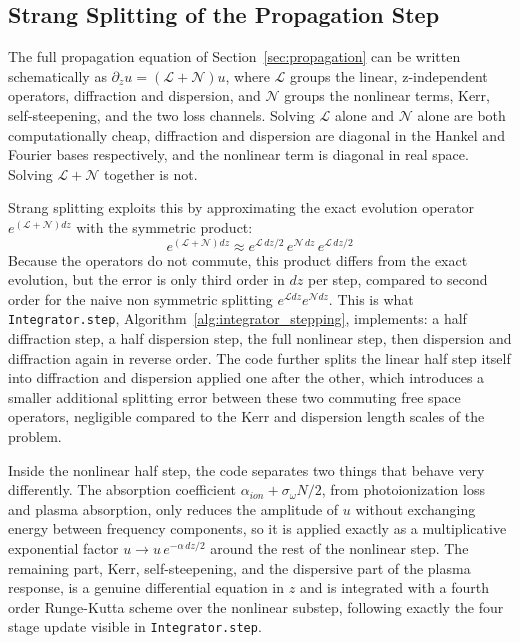 
\subsection{Strang Splitting of the Propagation Step}

The full propagation equation of Section~\ref{sec:propagation} can be written schematically as $\partial_z u = (\mathcal{L}+\mathcal{N})u$, where $\mathcal{L}$ groups the linear, z-independent operators, diffraction and dispersion, and $\mathcal{N}$ groups the nonlinear terms, Kerr, self-steepening, and the two loss channels. Solving $\mathcal{L}$ alone and $\mathcal{N}$ alone are both computationally cheap, diffraction and dispersion are diagonal in the Hankel and Fourier bases respectively, and the nonlinear term is diagonal in real space. Solving $\mathcal{L}+\mathcal{N}$ together is not.

Strang splitting exploits this by approximating the exact evolution operator $e^{(\mathcal{L}+\mathcal{N})dz}$ with the symmetric product:
\begin{equation}
e^{(\mathcal{L}+\mathcal{N})dz} \approx e^{\mathcal{L}\,dz/2}\,e^{\mathcal{N}\,dz}\,e^{\mathcal{L}\,dz/2}
\end{equation}
Because the operators do not commute, this product differs from the exact evolution, but the error is only third order in $dz$ per step, compared to second order for the naive non symmetric splitting $e^{\mathcal{L}dz}e^{\mathcal{N}dz}$. This is what \texttt{Integrator.step}, Algorithm~\ref{alg:integrator_stepping}, implements: a half diffraction step, a half dispersion step, the full nonlinear step, then dispersion and diffraction again in reverse order. The code further splits the linear half step itself into diffraction and dispersion applied one after the other, which introduces a smaller additional splitting error between these two commuting free space operators, negligible compared to the Kerr and dispersion length scales of the problem.

Inside the nonlinear half step, the code separates two things that behave very differently. The absorption coefficient $\alpha_{ion}+\sigma_\omega N/2$, from photoionization loss and plasma absorption, only reduces the amplitude of $u$ without exchanging energy between frequency components, so it is applied exactly as a multiplicative exponential factor $u \to u\,e^{-\alpha\,dz/2}$ around the rest of the nonlinear step. The remaining part, Kerr, self-steepening, and the dispersive part of the plasma response, is a genuine differential equation in $z$ and is integrated with a fourth order Runge-Kutta scheme over the nonlinear substep, following exactly the four stage update visible in \texttt{Integrator.step}.

